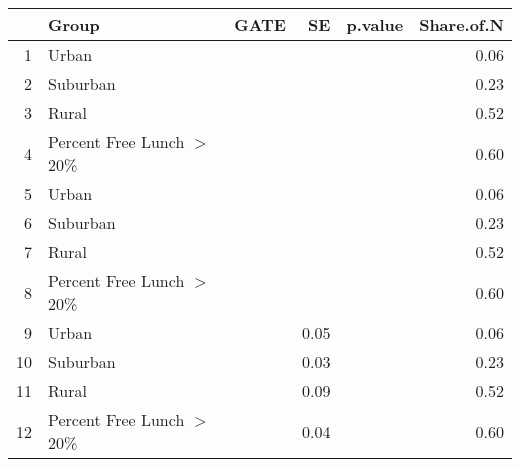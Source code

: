 \begin{tabular}{rlrrrr}
  \hline
 & Group & GATE & SE & p.value & Share.of.N \\ 
  \hline
1 & Urban &  &  &  & 0.06 \\ 
  2 & Suburban &  &  &  & 0.23 \\ 
  3 & Rural &  &  &  & 0.52 \\ 
  4 & Percent Free Lunch $>$ 20\% &  &  &  & 0.60 \\ 
  5 & Urban &  &  &  & 0.06 \\ 
  6 & Suburban &  &  &  & 0.23 \\ 
  7 & Rural &  &  &  & 0.52 \\ 
  8 & Percent Free Lunch $>$ 20\% &  &  &  & 0.60 \\ 
  9 & Urban &  & 0.05 &  & 0.06 \\ 
  10 & Suburban &  & 0.03 &  & 0.23 \\ 
  11 & Rural &  & 0.09 &  & 0.52 \\ 
  12 & Percent Free Lunch $>$ 20\% &  & 0.04 &  & 0.60 \\ 
   \hline
\end{tabular}
